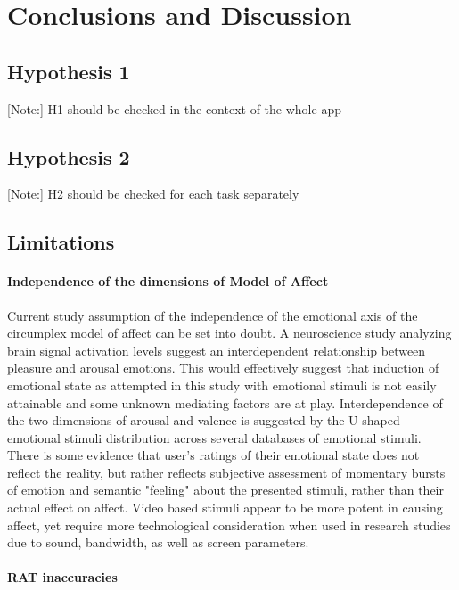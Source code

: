 \section{Conclusions and Discussion}

	\subsection{Hypothesis 1}
	
	[Note:] H1 should be checked in the context of the whole app
	
	\subsection{Hypothesis 2}
	
	[Note:] H2 should be checked for each task separately
	
	\subsection{Limitations}
	
	\paragraph{Independence of the dimensions of Model of Affect}
	
	Current study assumption of the independence of the emotional axis of the circumplex model of affect can be set into doubt. A neuroscience study \cite{Bestelmeyer2017} analyzing brain signal activation levels suggest an interdependent relationship between pleasure and arousal emotions. 
	This would effectively suggest that induction of emotional state as attempted in this study with emotional stimuli is not easily attainable and some unknown mediating factors are at play. Interdependence of the two dimensions of arousal and valence is suggested by the U-shaped emotional stimuli distribution across several databases of emotional stimuli. There is some evidence that user's ratings of their emotional state does not reflect the reality, but rather reflects subjective assessment of momentary bursts of emotion and semantic "feeling" about the presented stimuli, rather than their actual effect on affect. Video based stimuli appear to be more potent in causing affect, yet require more technological consideration when used in research studies due to sound, bandwidth, as well as screen parameters.
	
	\paragraph{RAT inaccuracies}
	
